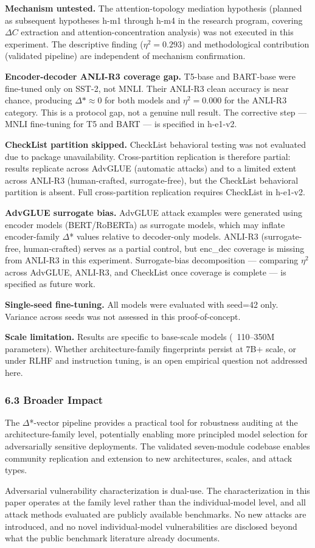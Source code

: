 \textbf{Mechanism untested.} The attention-topology mediation hypothesis (planned as subsequent hypotheses h-m1 through h-m4 in the research program, covering $\Delta C$ extraction and attention-concentration analysis) was not executed in this experiment. The descriptive finding ($\eta^{2}=0.293)$ and methodological contribution (validated pipeline) are independent of mechanism confirmation.

\textbf{Encoder-decoder ANLI-R3 coverage gap.} T5-base and BART-base were fine-tuned only on SST-2, not MNLI. Their ANLI-R3 clean accuracy is near chance, producing $\Delta*\approx 0$ for both models and $\eta^{2}=0.000$ for the ANLI-R3 category. This is a protocol gap, not a genuine null result. The corrective step --- MNLI fine-tuning for T5 and BART --- is specified in h-e1-v2.

\textbf{CheckList partition skipped.} CheckList behavioral testing was not evaluated due to package unavailability. Cross-partition replication is therefore partial: results replicate across AdvGLUE (automatic attacks) and to a limited extent across ANLI-R3 (human-crafted, surrogate-free), but the CheckList behavioral partition is absent. Full cross-partition replication requires CheckList in h-e1-v2.

\textbf{AdvGLUE surrogate bias.} AdvGLUE attack examples were generated using encoder models (BERT/RoBERTa) as surrogate models, which may inflate encoder-family $\Delta$* values relative to decoder-only models. ANLI-R3 (surrogate-free, human-crafted) serves as a partial control, but enc\_dec coverage is missing from ANLI-R3 in this experiment. Surrogate-bias decomposition --- comparing $\eta^2$ across AdvGLUE, ANLI-R3, and CheckList once coverage is complete --- is specified as future work.

\textbf{Single-seed fine-tuning.} All models were evaluated with seed=42 only. Variance across seeds was not assessed in this proof-of-concept.

\textbf{Scale limitation.} Results are specific to base-scale models (~110--350M parameters). Whether architecture-family fingerprints persist at 7B+ scale, or under RLHF and instruction tuning, is an open empirical question not addressed here.

\subsubsection{6.3 Broader Impact}

The $\Delta$*-vector pipeline provides a practical tool for robustness auditing at the architecture-family level, potentially enabling more principled model selection for adversarially sensitive deployments. The validated seven-module codebase enables community replication and extension to new architectures, scales, and attack types.

Adversarial vulnerability characterization is dual-use. The characterization in this paper operates at the family level rather than the individual-model level, and all attack methods evaluated are publicly available benchmarks. No new attacks are introduced, and no novel individual-model vulnerabilities are disclosed beyond what the public benchmark literature already documents.

